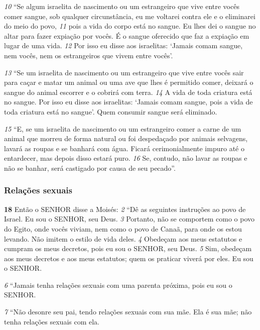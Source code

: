 \textit{\tiny 10}
“Se algum israelita de nascimento ou um estrangeiro que vive entre vocês
comer sangue, sob qualquer circunstância, eu me voltarei contra ele e o eliminarei
do meio do povo, 
\textit{\tiny 11}
pois a vida do corpo está no sangue. Eu lhes dei o sangue no
altar para fazer expiação por vocês. É o sangue oferecido que faz a expiação em
lugar de uma vida. 
\textit{\tiny 12}
Por isso eu disse aos israelitas: ‘Jamais comam sangue, nem
vocês, nem os estrangeiros que vivem entre vocês’.
   
\textit{\tiny 13}
“Se um israelita de nascimento ou um estrangeiro que vive entre vocês sair
para caçar e matar um animal ou uma ave que lhes é permitido comer, deixará o
sangue do animal escorrer e o cobrirá com terra. 
\textit{\tiny 14}
A vida de toda criatura está no
sangue. Por isso eu disse aos israelitas: ‘Jamais comam sangue, pois a vida de toda
criatura está no sangue’. Quem consumir sangue será eliminado.
   
\textit{\tiny 15}
“E, se um israelita de nascimento ou um estrangeiro comer a carne de um
animal que morreu de forma natural ou foi despedaçado por animais selvagens,
lavará as roupas e se banhará com água. Ficará cerimonialmente impuro até o
entardecer, mas depois disso estará puro. 
\textit{\tiny 16}
Se, contudo, não lavar as roupas e não
se banhar, será castigado por causa de seu pecado”.

\bigskip
\subsubsection*{Relações sexuais}
   
\textbf{\large 18}
 Então o SENHOR disse a Moisés: 
\textit{\tiny 2} 
“Dê as seguintes instruções ao povo de
Israel. Eu sou o SENHOR, seu Deus. 
\textit{\tiny 3} 
Portanto, não se comportem como o povo do
Egito, onde vocês viviam, nem como o povo de Canaã, para onde os estou levando.
Não imitem o estilo de vida deles. 
\textit{\tiny 4} 
Obedeçam aos meus estatutos e cumpram os
meus decretos, pois eu sou o SENHOR, seu Deus. 
\textit{\tiny 5} 
Sim, obedeçam aos meus
decretos e aos meus estatutos; quem os praticar viverá por eles. Eu sou o SENHOR. 

\smallskip
\textit{\tiny 6} 
“Jamais tenha relações sexuais com uma parenta próxima, pois eu sou o
SENHOR. 

\smallskip
\textit{\tiny 7} 
“Não desonre seu pai, tendo relações sexuais com sua mãe. Ela é sua mãe; não
tenha relações sexuais com ela. 


